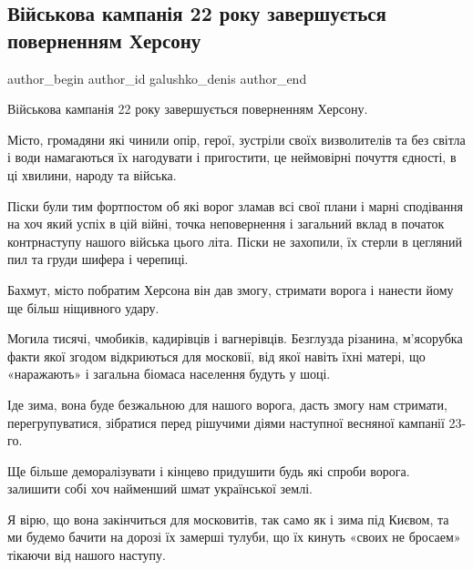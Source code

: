  
 
 
 
 

\subsection{Військова кампанія 22 року завершується поверненням Херсону}
\label{sec:13_11_2022.fb.galushko_denis.1.v_iskova_kampan_ya_2}

\ifcmt
 author_begin
   author_id galushko_denis
 author_end
\fi

Військова кампанія 22 року завершується поверненням Херсону.

Місто, громадяни які чинили опір, герої, зустріли своїх визволителів та без
світла і води намагаються їх нагодувати і пригостити, це неймовірні почуття
єдності, в ці хвилини, народу та війська. 

Піски були тим фортпостом об які ворог зламав всі свої плани і марні сподівання
на хоч який успіх в цій війні, точка неповернення і загальний вклад в початок
контрнаступу нашого війська цього літа. Піски не захопили, їх стерли в
цегляний пил та груди шифера і черепиці. 

Бахмут, місто побратим Херсона він дав змогу, стримати ворога і нанести йому ще
більш ніщивного удару. 

Могила тисячі, чмобиків, кадирівців і вагнерівців.  Безглузда різанина,
м’ясорубка факти якої згодом відкриються для московії, від якої навіть їхні
матері, що «наражають» і загальна біомаса населення будуть у шоці. 

Іде зима, вона буде безжальною для нашого ворога, дасть змогу нам стримати,
перегрупуватися, зібратися перед рішучими діями наступної весняної кампанії
23-го. 

Ще більше деморалізувати і кінцево придушити будь які спроби ворога. залишити
собі хоч найменший шмат української землі. 

Я вірю, що вона закінчиться для московитів, так само як і зима під Києвом, та
ми будемо бачити на дорозі їх замерші тулуби, що їх кинуть «своих не бросаем»
тікаючи від нашого наступу.  

